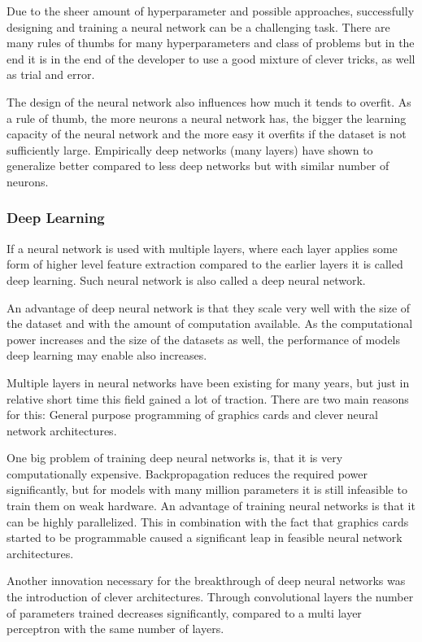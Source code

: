 \documentclass[draft,final,oneside]{vutinfth} %
\begin{document}

Due to the sheer amount of hyperparameter and possible approaches, successfully designing and training a neural network can be a challenging task. There are many rules of thumbs for many hyperparameters and class of problems but in the end it is in the end of the developer to use a good mixture of clever tricks, as well as trial and error.

The design of the neural network also influences how much it tends to overfit. As a rule of thumb, the more neurons a neural network has, the bigger the learning capacity of the neural network and the more easy it overfits if the dataset is not sufficiently large. Empirically deep networks (many layers) have shown to generalize better compared to less deep networks but with similar number of neurons.

\subsubsection{Deep Learning}

If a neural network is used with multiple layers, where each layer applies some form of higher level feature extraction compared to the earlier layers it is called deep learning. Such neural network is also called a deep neural network.

An advantage of deep neural network is that they scale very well with the size of the dataset and with the amount of computation available. As the computational power increases and the size of the datasets as well, the performance of models deep learning may enable also increases.

Multiple layers in neural networks have been existing for many years, but just in relative short time this field gained a lot of traction. There are two main reasons for this: General purpose programming of graphics cards and clever neural network architectures.

One big problem of training deep neural networks is, that it is very computationally expensive. Backpropagation reduces the required power significantly, but for models with many million parameters it is still infeasible to train them on weak hardware. An advantage of training neural networks is that it can be highly parallelized. This in combination with the fact that graphics cards started to be programmable caused a significant leap in feasible neural network architectures.

Another innovation necessary for the breakthrough of deep neural networks was the introduction of clever architectures. Through convolutional layers the number of parameters trained decreases significantly, compared to a multi layer perceptron with the same number of layers.
\end{document}
